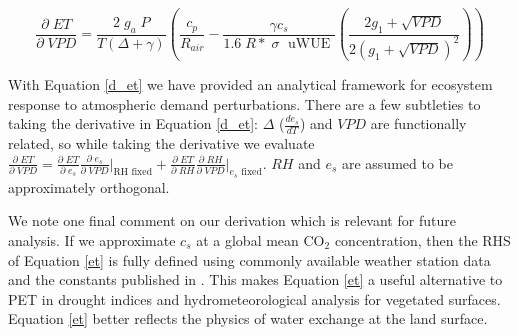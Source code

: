 \documentclass[draft,linenumbers]{agujournal}
\begin{document}
\begin{linenomath*}
  \begin{equation}
    \frac{\partial \;  ET}{\partial \; VPD} = \frac{2\; g_a \; P}{T(\Delta + \gamma)}   \left(\frac{ c_p}{R_{air}} -  \frac{\gamma c_s }{1.6 \; R*\; \sigma \; \text{ uWUE }} \left( \frac{2 g_1 + \sqrt{VPD}}{2 (g_1 + \sqrt{VPD})^2}\right) \right)
    \label{d_et}
  \end{equation}
\end{linenomath*}

With Equation \ref{d_et} we have provided an analytical framework for ecosystem response to atmospheric demand perturbations. There are a few subtleties to taking the derivative in Equation \ref{d_et}: $\Delta$ ($\frac{d e_{s}}{d T}$) and $VPD$ are functionally related, so while taking the derivative we evaluate $\frac{\partial \; ET}{\partial \; VPD} = \frac{\partial \; ET} {\partial \; e_s} \frac{\partial \; e_s}{\partial \; VPD} \Big|_{\text{RH fixed}} + \frac{\partial \; ET}{\partial \; RH} \frac{\partial \; RH}{\partial \; VPD} \Big|_{\text{$e_s$ fixed}}$. $RH$ and $e_s$ are assumed to be approximately orthogonal. 

We note one final comment on our derivation which is relevant for future analysis. If we  approximate $c_s$ at a global mean CO$_2$ concentration, then the RHS of Equation \ref{et} is fully defined using commonly available weather station data and the constants published in \citet{Zhou_2015, Lin_2015}. This makes Equation \ref{et} a useful alternative to PET in drought indices and hydrometeorological analysis for vegetated surfaces. Equation \ref{et} better reflects the physics of water exchange at the land surface. 
\end{document}
